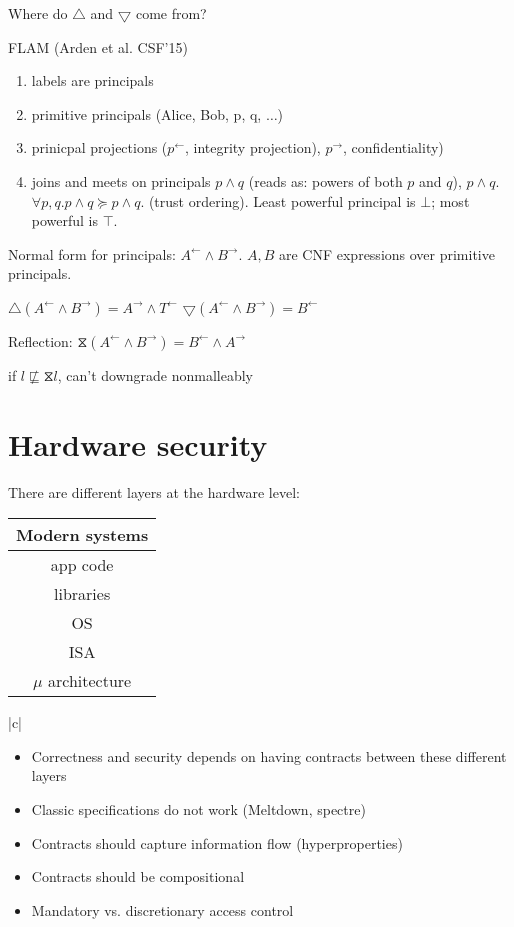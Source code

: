 \documentclass{article}
\newcommand{\la}{^{\leftarrow}}
\newcommand{\ra}{^{\rightarrow}}
\newcommand{\refl}{\hourglass}
\begin{document}
Where do $\bigtriangleup$ and $\bigtriangledown$ come from?

FLAM (Arden et al. CSF'15)

\begin{enumerate}
    \item labels are principals
    \item primitive principals (Alice, Bob, p, q, $\ldots$)
    \item prinicpal projections ($p^{\leftarrow}$, integrity projection), $p^{\rightarrow}$, confidentiality)
    \item joins and meets on principals $p \land q$ (reads as: powers of both $p$ and $q$), $p \wedge q$. $\forall p,q. p \land q \succeq p \wedge q$. (trust ordering). Least powerful principal is $\bot$; most powerful is $\top$. %
\end{enumerate}

Normal form for principals: $A^{\leftarrow} \land B^{\rightarrow}$.
$A,B$ are CNF expressions over primitive principals.

$\bigtriangleup (A \la \land B \ra) = A \ra \land T \la$
$\bigtriangledown (A \la \land B \ra) = B \la$

Reflection: $ \refl (A \la \land B \ra) = B \la \land A \ra$

if $l \not\sqsubseteq \refl l$, can't downgrade nonmalleably

\section{Hardware security}

There are different layers at the hardware level: \\

\begin{tabular}{|c|}
\hline
Modern systems \\
\hline
app code \\
\hline
libraries \\ 
\hline
OS \\
\hline
ISA \\ 
\hline
$\mu$ architecture \\
\hline
\end{tabular}{|c|} \\

\begin{itemize}
	\item{Correctness and security depends on having contracts between these different layers}
	\item{Classic specifications do not work (Meltdown, spectre)}
	\item{Contracts should capture information flow (hyperproperties)}
	\item{Contracts should be compositional}
	\item{Mandatory vs. discretionary access control}
\end{itemize}
\end{document}
